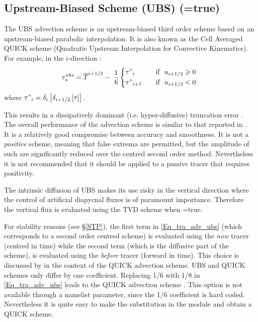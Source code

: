 \subsection   [Upstream-Biased Scheme (UBS) (\np{ln\_traadv\_ubs})]
			{Upstream-Biased Scheme (UBS) (=true)}
\label{TRA_adv_ubs}

The UBS advection scheme is an upstream-biased third order scheme based on 
an upstream-biased parabolic interpolation. It is also known as the Cell 
Averaged QUICK scheme (Quadratic Upstream Interpolation for Convective 
Kinematics). For example, in the $i$-direction :
\begin{equation} \label{Eq_tra_adv_ubs}
   \tau _u^{ubs} =\overline T ^{i+1/2}-\;\frac{1}{6} \left\{      
   \begin{aligned}
         &\tau"_i        	& \quad \text{if }\ u_{i+1/2} \geqslant 0      \\
         &\tau"_{i+1}	& \quad \text{if }\ u_{i+1/2}       <       0
   \end{aligned}    \right.
\end{equation}
where $\tau "_i =\delta _i \left[ {\delta _{i+1/2} \left[ \tau \right]} \right]$.

This results in a dissipatively dominant (i.e. hyper-diffusive) truncation 
error \citep{Shchepetkin_McWilliams_OM05}. The overall performance of the advection 
scheme is similar to that reported in \cite{Farrow1995}. 
It is a relatively good compromise between accuracy and smoothness. 
It is not a \emph{positive} scheme, meaning that false extrema are permitted, 
but the amplitude of such are significantly reduced over the centred second 
order method. Nevertheless it is not recommended that it should be applied 
to a passive tracer that requires positivity. 

The intrinsic diffusion of UBS makes its use risky in the vertical direction 
where the control of artificial diapycnal fluxes is of paramount importance. 
Therefore the vertical flux is evaluated using the TVD scheme when 
=true.

For stability reasons  (see \S\ref{STP}),
the first term  in \eqref{Eq_tra_adv_ubs} (which corresponds to a second order centred scheme) 
is evaluated using the \textit{now} tracer (centred in time) while the 
second term (which is the diffusive part of the scheme), is 
evaluated using the \textit{before} tracer (forward in time). 
This choice is discussed by \citet{Webb_al_JAOT98} in the context of the 
QUICK advection scheme. UBS and QUICK schemes only differ 
by one coefficient. Replacing 1/6 with 1/8 in \eqref{Eq_tra_adv_ubs} 
leads to the QUICK advection scheme \citep{Webb_al_JAOT98}. 
This option is not available through a namelist parameter, since the 
1/6 coefficient is hard coded. Nevertheless it is quite easy to make the 
substitution in the  module and obtain a QUICK scheme.

